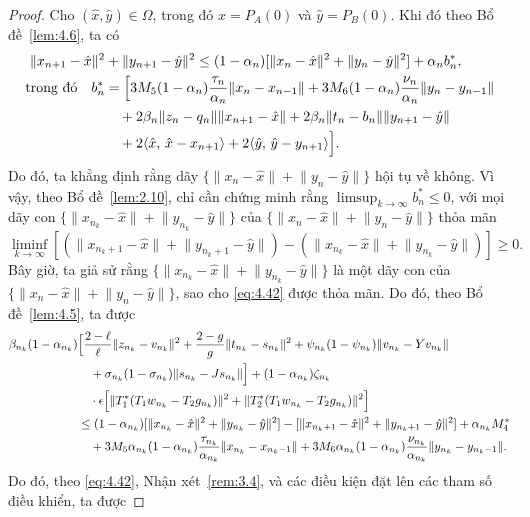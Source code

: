 \documentclass{MyBook}
\theoremstyle{plain}
\theoremstyle{definition}
\theoremstyle{remark}
\numberwithin{equation}{chapter}
\newcommand{\inp}[2]{\langle #1,\,#2\rangle}
\newcommand{\nm}[1]{\lVert #1\rVert}
\begin{document}
\begin{proof}
Cho $(\hat{x},\hat{y})\in\Omega$, trong đó $\hat{x}=P_A(0)$ và $\hat{y}=P_B(0)$. Khi đó theo Bổ đề~\ref{lem:4.6}, ta có
\begin{align}
\nm{x_{n+1}-\hat{x}}^2 &+ \nm{y_{n+1}-\hat{y}}^2\le(1-\alpha_n)[\nm{x_n-\hat{x}}^2+\nm{y_n-\hat{y}}^2]+\alpha_n b_n^{*},\notag\\
\text{trong đó}\quad b_n^{*} &= \Bigl[3M_5(1-\alpha_n)\frac{\tau_n}{\alpha_n}\nm{x_n-x_{n-1}}+3M_6(1-\alpha_n)\frac{\nu_n}{\alpha_n}\nm{y_n-y_{n-1}}\notag\\
&\quad +2\beta_n\nm{z_n-q_n}\nm{x_{n+1}-\hat{x}}+2\beta_n\nm{t_n-b_n}\nm{y_{n+1}-\hat{y}}\notag\\
&\quad +2\inp{\hat{x}}{\hat{x}-x_{n+1}}+2\inp{\hat{y}}{\hat{y}-y_{n+1}}\Bigr]. \label{eq:4.41}
\end{align}
Do đó, ta khẳng định rằng dãy $\{\nm{x_n-\hat{x}}+\nm{y_n-\hat{y}}\}$ hội tụ về không. Vì vậy, theo Bổ đề~\ref{lem:2.10}, chỉ cần chứng minh rằng $\limsup_{k\to\infty}b_n^{*}\le 0$, với mọi dãy con $\{\nm{x_{n_k}-\hat{x}}+\nm{y_{n_k}-\hat{y}}\}$ của $\{\nm{x_n-\hat{x}}+\nm{y_n-\hat{y}}\}$ thỏa mãn
\begin{equation}
\liminf_{k\to\infty}[(\nm{x_{n_k+1}-\hat{x}}+\nm{y_{n_k+1}-\hat{y}})-(\nm{x_{n_k}-\hat{x}}+\nm{y_{n_k}-\hat{y}})]\ge 0. \label{eq:4.42}
\end{equation}
Bây giờ, ta giả sử rằng $\{\nm{x_{n_k}-\hat{x}}+\nm{y_{n_k}-\hat{y}}\}$ là một dãy con của $\{\nm{x_n-\hat{x}}+\nm{y_n-\hat{y}}\}$, sao cho \eqref{eq:4.42} được thỏa mãn. Do đó, theo Bổ đề~\ref{lem:4.5}, ta được
\begin{align*}
\beta_{n_k}(1-\alpha_{n_k}) &\Bigl[\frac{2-\ell}{\ell}\nm{z_{n_k}-v_{n_k}}^2+\frac{2-g}{g}\nm{t_{n_k}-s_{n_k}}^2+\psi_{n_k}(1-\psi_{n_k})\nm{v_{n_k}-Yv_{n_k}}\\
&\quad +\sigma_{n_k}(1-\sigma_{n_k})\nm{s_{n_k}-Js_{n_k}}\Bigr]+(1-\alpha_{n_k})\zeta_{n_k}\\
&\quad \cdot\epsilon\Bigl[\nm{T_1^{*}(T_1w_{n_k}-T_2g_{n_k})}^2+\nm{T_2^{*}(T_1w_{n_k}-T_2g_{n_k})}^2\Bigr]\\
&\le (1-\alpha_{n_k})[\nm{x_{n_k}-\hat{x}}^2+\nm{y_{n_k}-\hat{y}}^2]-[\nm{x_{n_k+1}-\hat{x}}^2+\nm{y_{n_k+1}-\hat{y}}^2]+\alpha_{n_k}M_4^{*}\\
&\quad +3M_5\alpha_{n_k}(1-\alpha_{n_k})\frac{\tau_{n_k}}{\alpha_{n_k}}\nm{x_{n_k}-x_{n_k-1}}+3M_6\alpha_{n_k}(1-\alpha_{n_k})\frac{\nu_{n_k}}{\alpha_{n_k}}\nm{y_{n_k}-y_{n_k-1}}.
\end{align*}
Do đó, theo \eqref{eq:4.42}, Nhận xét~\ref{rem:3.4}, và các điều kiện đặt lên các tham số điều khiển, ta được

\end{proof}
\end{document}
